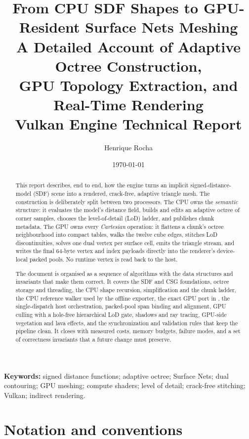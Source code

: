 \documentclass[11pt,a4paper]{article}
\title{%
  \vspace{-1.2cm}
  \textbf{From CPU SDF Shapes to GPU-Resident Surface Nets Meshing}\\[4pt]
  {\large A Detailed Account of Adaptive Octree Construction,\\
  GPU Topology Extraction, and Real-Time Rendering}\\[8pt]
  {\normalsize Vulkan Engine Technical Report}
}
\author{Henrique Rocha}
\date{\today}
\newcommand{\code}[1]{\texttt{\detokenize{#1}}}
\begin{document}
\maketitle
\thispagestyle{empty}

\begin{abstract}
This report describes, end to end, how the engine turns an implicit
signed-distance-model (SDF) scene into a rendered, crack-free, adaptive
triangle mesh.  The construction is deliberately split between two
processors.  The CPU owns the \emph{semantic} structure: it evaluates the
model's distance field, builds and edits an adaptive octree of corner
samples, chooses the level-of-detail (LoD) ladder, and publishes chunk
metadata.  The GPU owns every \emph{Cartesian} operation: it flattens a
chunk's octree neighbourhood into compact tables, walks the twelve cube
edges, stitches LoD discontinuities, solves one dual vertex per surface
cell, emits the triangle stream, and writes the final 64-byte vertex and
index payloads directly into the renderer's device-local packed pools.
No runtime vertex is read back to the host.

The document is organised as a sequence of algorithms with the data
structures and invariants that make them correct.  It covers the SDF and
CSG foundations, octree storage and threading, the CPU shape recursion,
simplification and the chunk ladder, the CPU reference walker used by the
offline exporter, the exact GPU port in \code{OctreeTriangles.comp}, the
single-dispatch host orchestration, packed-pool span binding and alignment,
GPU culling with a hole-free hierarchical LoD gate, shadows and ray
tracing, GPU-side vegetation and lava effects, and the synchronization and
validation rules that keep the pipeline clean.  It closes with measured
costs, memory budgets, failure modes, and a set of correctness invariants
that a future change must preserve.
\end{abstract}

\vspace{0.5em}
\noindent\textbf{Keywords:} signed distance functions; adaptive octree;
Surface Nets; dual contouring; GPU meshing; compute shaders; level of
detail; crack-free stitching; Vulkan; indirect rendering.

\tableofcontents
\listoffigures
\listoftables
\listofalgorithms

\newpage
\section*{Notation and conventions}
\end{document}

